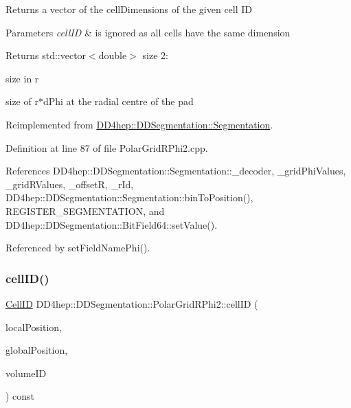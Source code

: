 Returns a vector of the cell\+Dimensions of the given cell ID 
\begin{DoxyParams}{Parameters}
{\em cell\+ID} & is ignored as all cells have the same dimension \\
\hline
\end{DoxyParams}
\begin{DoxyReturn}{Returns}
std\+::vector$<$double$>$ size 2\+:
\begin{DoxyEnumerate}
\item size in r
\item size of r$\ast$d\+Phi at the radial centre of the pad 
\end{DoxyEnumerate}
\end{DoxyReturn}


Reimplemented from \hyperlink{class_d_d4hep_1_1_d_d_segmentation_1_1_segmentation_ac2119ba64c9805751e08b6100ef6fee6}{D\+D4hep\+::\+D\+D\+Segmentation\+::\+Segmentation}.



Definition at line 87 of file Polar\+Grid\+R\+Phi2.\+cpp.



References D\+D4hep\+::\+D\+D\+Segmentation\+::\+Segmentation\+::\+\_\+decoder, \+\_\+grid\+Phi\+Values, \+\_\+grid\+R\+Values, \+\_\+offsetR, \+\_\+r\+Id, D\+D4hep\+::\+D\+D\+Segmentation\+::\+Segmentation\+::bin\+To\+Position(), R\+E\+G\+I\+S\+T\+E\+R\+\_\+\+S\+E\+G\+M\+E\+N\+T\+A\+T\+I\+ON, and D\+D4hep\+::\+D\+D\+Segmentation\+::\+Bit\+Field64\+::set\+Value().



Referenced by set\+Field\+Name\+Phi().

\hypertarget{class_d_d4hep_1_1_d_d_segmentation_1_1_polar_grid_r_phi2_a173f2b845ff7871249b2a8dcf70f3ab1}{}\label{class_d_d4hep_1_1_d_d_segmentation_1_1_polar_grid_r_phi2_a173f2b845ff7871249b2a8dcf70f3ab1} 
\subsubsection{\texorpdfstring{cell\+I\+D()}{cellID()}}
{\footnotesize\ttfamily \hyperlink{namespace_d_d4hep_1_1_d_d_segmentation_ac7af071d85cb48820914434a07e21ba1}{Cell\+ID} D\+D4hep\+::\+D\+D\+Segmentation\+::\+Polar\+Grid\+R\+Phi2\+::cell\+ID (\begin{DoxyParamCaption}\item[{const \hyperlink{struct_d_d4hep_1_1_d_d_segmentation_1_1_vector3_d}{Vector3D} \&}]{local\+Position,  }\item[{const \hyperlink{struct_d_d4hep_1_1_d_d_segmentation_1_1_vector3_d}{Vector3D} \&}]{global\+Position,  }\item[{const \hyperlink{namespace_d_d4hep_1_1_d_d_segmentation_a61a6833a18d1800bdef176595f83e3ba}{Volume\+ID} \&}]{volume\+ID }\end{DoxyParamCaption}) const\hspace{0.3cm}{\ttfamily [virtual]}}



